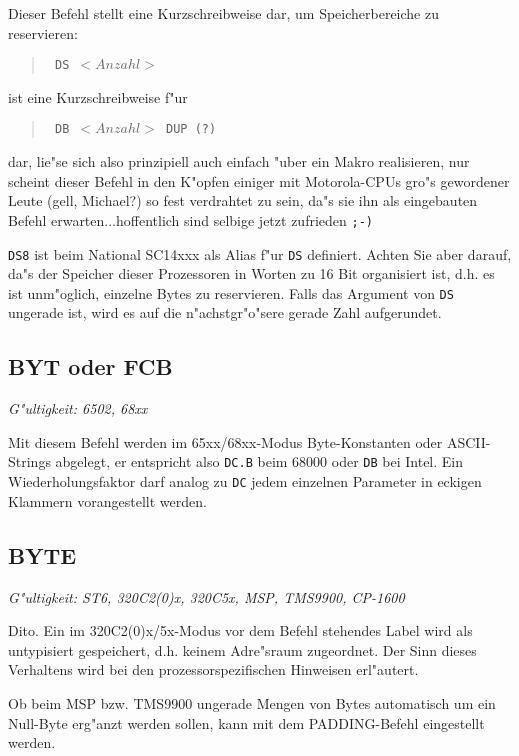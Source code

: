 \documentclass[12pt,a4paper,twoside]{report}
\makeatletter
\newcommand{\tty}[1]{{\tt #1}}
\newcommand{\ttindex}[1]{\index{#1@{\tt #1}}}
\makeatother
\begin{document}
Dieser Befehl stellt eine Kurzschreibweise dar, um Speicherbereiche
zu reservieren:
\begin{quote}{\tt
        DS       $<Anzahl>$
}\end{quote}
ist eine Kurzschreibweise f"ur
\begin{quote}{\tt
        DB       $<Anzahl>$ DUP (?)
}\end{quote}
dar, lie"se sich also prinzipiell auch einfach "uber ein Makro realisieren,
nur scheint dieser Befehl in den K"opfen einiger mit Motorola-CPUs gro"s
gewordener Leute (gell, Michael?) so fest verdrahtet zu sein, da"s sie
ihn als eingebauten Befehl erwarten...hoffentlich sind selbige jetzt
zufrieden {\tt ;-)}

{\tt DS8} ist beim National SC14xxx als Alias f"ur {\tt DS} definiert.
Achten Sie aber darauf, da"s der Speicher dieser Prozessoren in Worten zu
16 Bit organisiert ist, d.h. es ist unm"oglich, einzelne Bytes zu
reservieren.  Falls das Argument von {\tt DS} ungerade ist, wird es auf
die n"achstgr"o"sere gerade Zahl aufgerundet.


\subsection{BYT oder FCB}
\ttindex{BYT}\ttindex{FCB}

{\em G"ultigkeit: 6502, 68xx}

Mit diesem Befehl werden im 65xx/68xx-Modus Byte-Konstanten oder
ASCII-Strings abgelegt, er entspricht also \tty{DC.B} beim 68000 oder
\tty{DB} bei Intel.  Ein Wiederholungsfaktor darf analog zu \tty{DC}
jedem einzelnen Parameter in eckigen Klammern vorangestellt werden.


\subsection{BYTE}
\ttindex{BYTE}

{\em G"ultigkeit: ST6, 320C2(0)x, 320C5x, MSP, TMS9900, CP-1600}

Dito.  Ein im 320C2(0)x/5x-Modus vor dem Befehl stehendes Label wird
als untypisiert gespeichert, d.h. keinem Adre"sraum zugeordnet.
Der Sinn dieses Verhaltens wird bei den prozessorspezifischen
Hinweisen erl"autert.

Ob beim MSP bzw. TMS9900 ungerade Mengen von Bytes automatisch um
ein Null-Byte erg"anzt werden sollen, kann mit dem PADDING-Befehl
eingestellt werden.
\end{document}
